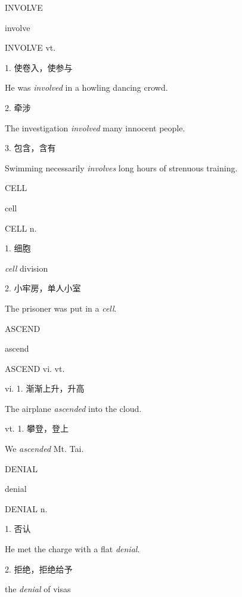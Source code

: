 \begin{flashcard}{
INVOLVE

involve
}
\begin{center}
INVOLVE vt. 
\end{center}
1. 使卷入，使参与

He was \textit{involved} in a howling dancing crowd.

2. 牵涉

The investigation \textit{involved} many innocent people.

3. 包含，含有

Swimming necessarily \textit{involves} long hours of strenuous training.

\end{flashcard}
\begin{flashcard}{
CELL

cell
}
\begin{center}
CELL n. \textipa{[sel]}
\end{center}
1. 细胞

\textit{cell} division

2. 小牢房，单人小室

The prisoner was put in a \textit{cell}.

\end{flashcard}
\begin{flashcard}{
ASCEND

ascend
}
\begin{center}
ASCEND vi. vt. 
\end{center}
vi. 1. 渐渐上升，升高

The airplane \textit{ascended} into the cloud.

vt. 1. 攀登，登上

We \textit{ascended} Mt. Tai.

\end{flashcard}
\begin{flashcard}{
DENIAL

denial
}
\begin{center}
DENIAL n. 
\end{center}
1. 否认

He met the charge with a flat \textit{denial}.

2. 拒绝，拒绝给予

the \textit{denial} of visas

\end{flashcard}
